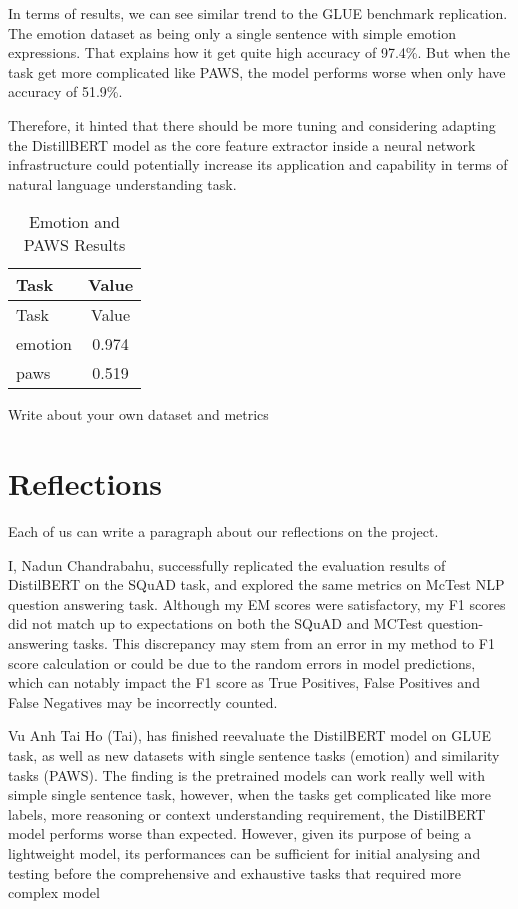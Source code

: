 \documentclass[
  11pt,
]{article}
\begin{document}
In terms of results, we can see similar trend to the GLUE benchmark
replication. The emotion dataset as being only a single sentence with
simple emotion expressions. That explains how it get quite high accuracy
of 97.4\%. But when the task get more complicated like PAWS, the model
performs worse when only have accuracy of 51.9\%.

Therefore, it hinted that there should be more tuning and considering
adapting the DistillBERT model as the core feature extractor inside a
neural network infrastructure could potentially increase its application
and capability in terms of natural language understanding task.

\begin{longtable}[]{@{}lc@{}}
\caption{Emotion and PAWS Results}\tabularnewline
\toprule\noalign{}
Task & Value \\
\midrule\noalign{}
\endfirsthead
\toprule\noalign{}
Task & Value \\
\midrule\noalign{}
\endhead
\bottomrule\noalign{}
\endlastfoot
emotion & 0.974 \\
paws & 0.519 \\
\end{longtable}

Write about your own dataset and metrics

\hypertarget{reflections}{%
\section{Reflections}\label{reflections}}

Each of us can write a paragraph about our reflections on the project.

I, Nadun Chandrabahu, successfully replicated the evaluation results of
DistilBERT on the SQuAD task, and explored the same metrics on McTest
NLP question answering task. Although my EM scores were satisfactory, my
F1 scores did not match up to expectations on both the SQuAD and MCTest
question-answering tasks. This discrepancy may stem from an error in my
method to F1 score calculation or could be due to the random errors in
model predictions, which can notably impact the F1 score as True
Positives, False Positives and False Negatives may be incorrectly
counted.

Vu Anh Tai Ho (Tai), has finished reevaluate the DistilBERT model on
GLUE task, as well as new datasets with single sentence tasks (emotion)
and similarity tasks (PAWS). The finding is the pretrained models can
work really well with simple single sentence task, however, when the
tasks get complicated like more labels, more reasoning or context
understanding requirement, the DistilBERT model performs worse than
expected. However, given its purpose of being a lightweight model, its
performances can be sufficient for initial analysing and testing before
the comprehensive and exhaustive tasks that required more complex model
\end{document}
